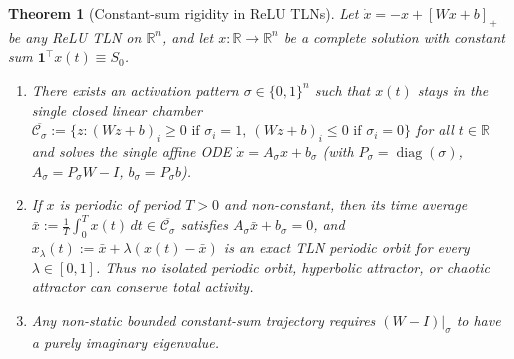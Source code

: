 \documentclass[11pt]{article}
\theoremstyle{plain}
\newtheorem{theorem}{Theorem}
\theoremstyle{definition}
\theoremstyle{remark}
\DeclareMathOperator{\diag}{diag}
\begin{document}
\begin{theorem}[Constant-sum rigidity in ReLU TLNs]\label{thm:oq11}
Let $\dot{x} = -x + [Wx + b]_+$ be any ReLU TLN on $\mathbb{R}^n$, and let $x : \mathbb{R} \to \mathbb{R}^n$ be a complete solution with constant sum $\mathbf{1}^\top x(t) \equiv S_0$.
\begin{enumerate}[label=\textup{(\arabic*)}]
\item There exists an activation pattern $\sigma \in \{0, 1\}^n$ such that $x(t)$ stays in the single closed linear chamber $\overline{\mathcal{C}_\sigma} := \{z : (Wz+b)_i \ge 0 \text{ if } \sigma_i=1,\ (Wz+b)_i \le 0 \text{ if } \sigma_i=0\}$ for all $t \in \mathbb{R}$ and solves the single affine ODE $\dot{x} = A_\sigma x + b_\sigma$ (with $P_\sigma = \diag(\sigma)$, $A_\sigma = P_\sigma W - I$, $b_\sigma = P_\sigma b$).
\item If $x$ is periodic of period $T > 0$ and non-constant, then its time average $\bar{x} := \frac{1}{T}\int_0^T x(t)\,dt \in \overline{\mathcal{C}_\sigma}$ satisfies $A_\sigma \bar{x} + b_\sigma = 0$, and $x_\lambda(t) := \bar{x} + \lambda(x(t) - \bar{x})$ is an exact TLN periodic orbit for every $\lambda \in [0, 1]$. Thus no isolated periodic orbit, hyperbolic attractor, or chaotic attractor can conserve total activity.
\item Any non-static bounded constant-sum trajectory requires $(W - I)|_\sigma$ to have a purely imaginary eigenvalue.
\end{enumerate}
\end{theorem}
\end{document}
